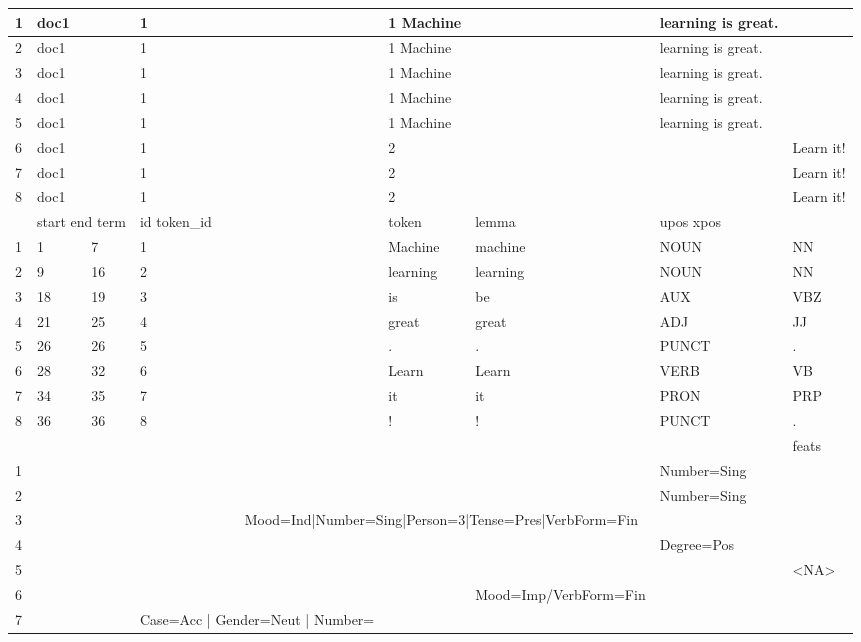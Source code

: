 \documentclass[10pt]{book}
\begin{document}
\begin{center}
\begin{tabular}{|l|l|l|l|l|l|l|l|l|}
\hline
1 & doc1 &  &  & 1 & 1 Machine &  & learning is great. &  \\
\hline
2 & doc1 &  &  & 1 & 1 Machine &  & learning is great. &  \\
\hline
3 & doc1 &  &  & 1 & 1 Machine &  & learning is great. &  \\
\hline
4 & doc1 &  &  & 1 & 1 Machine &  & learning is great. &  \\
\hline
5 & doc1 &  &  & 1 & 1 Machine &  & learning is great. &  \\
\hline
6 & doc1 &  &  & 1 & 2 &  &  & Learn it! \\
\hline
7 & doc1 &  &  & 1 & 2 &  &  & Learn it! \\
\hline
8 & doc1 &  &  & 1 & 2 &  &  & Learn it! \\
\hline
 & \multicolumn{3}{|c|}{start end term} & id token\_id & token & lemma & upos xpos &  \\
\hline
1 & 1 & 7 &  & 1 & Machine & machine & NOUN & NN \\
\hline
2 & 9 & 16 &  & 2 & learning & learning & NOUN & NN \\
\hline
3 & 18 & 19 &  & 3 & is & be & AUX & VBZ \\
\hline
4 & 21 & 25 &  & 4 & great & great & ADJ & JJ \\
\hline
5 & 26 & 26 &  & 5 & . & . & PUNCT & . \\
\hline
6 & 28 & 32 &  & 6 & Learn & Learn & VERB & VB \\
\hline
7 & 34 & 35 &  & 7 & it & it & PRON & PRP \\
\hline
8 & 36 & 36 &  & 8 & ! & ! & PUNCT & . \\
\hline
 &  &  &  &  &  &  &  & feats \\
\hline
1 &  &  &  &  &  &  & Number=Sing &  \\
\hline
2 &  &  &  &  &  &  & Number=Sing &  \\
\hline
3 & \multicolumn{8}{|c|}{Mood=Ind|Number=Sing|Person=3|Tense=Pres|VerbForm=Fin} \\
\hline
4 &  &  &  &  &  &  & Degree=Pos &  \\
\hline
5 &  &  &  &  &  &  &  & <NA> \\
\hline
6 &  &  &  &  &  & Mood=Imp/VerbForm=Fin &  &  \\
\hline
7 &  &  &  & Case=Acc | Gender=Neut | Number= & \multicolumn{4}{|c|}{} \\

\end{tabular}
\end{center}
\end{document}
